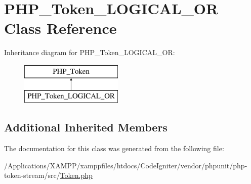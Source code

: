 \hypertarget{class_p_h_p___token___l_o_g_i_c_a_l___o_r}{}\section{P\+H\+P\+\_\+\+Token\+\_\+\+L\+O\+G\+I\+C\+A\+L\+\_\+\+OR Class Reference}
\label{class_p_h_p___token___l_o_g_i_c_a_l___o_r}
Inheritance diagram for P\+H\+P\+\_\+\+Token\+\_\+\+L\+O\+G\+I\+C\+A\+L\+\_\+\+OR\+:\begin{figure}[H]
\begin{center}
\leavevmode
\includegraphics[height=2.000000cm]{class_p_h_p___token___l_o_g_i_c_a_l___o_r}
\end{center}
\end{figure}
\subsection*{Additional Inherited Members}


The documentation for this class was generated from the following file\+:\begin{DoxyCompactItemize}
\item 
/\+Applications/\+X\+A\+M\+P\+P/xamppfiles/htdocs/\+Code\+Igniter/vendor/phpunit/php-\/token-\/stream/src/\mbox{\hyperlink{_token_8php}{Token.\+php}}\end{DoxyCompactItemize}
